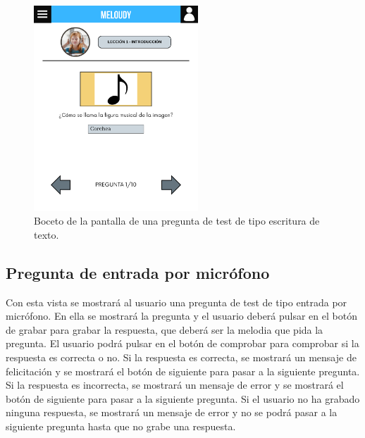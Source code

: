 \begin{figure}[H]
    \centering
    \centerline{\includegraphics[width=0.55\textwidth, frame]{imagenes/c6/7.png}}
    \caption{Boceto de la pantalla de una pregunta de test de tipo escritura de texto.}
    \label{fig:escrituratexto}
\end{figure}

\newpage

\subsection*{Pregunta de entrada por micrófono}

Con esta vista se mostrará al usuario una pregunta de test de tipo entrada por micrófono. En ella se mostrará la pregunta y el usuario deberá pulsar en el botón de grabar para grabar la respuesta, que deberá ser la melodia que pida la pregunta. El usuario podrá pulsar en el botón de comprobar para comprobar si la respuesta es correcta o no. Si la respuesta es correcta, se mostrará un mensaje de felicitación y se mostrará el botón de siguiente para pasar a la siguiente pregunta. Si la respuesta es incorrecta, se mostrará un mensaje de error y se mostrará el botón de siguiente para pasar a la siguiente pregunta. Si el usuario no ha grabado ninguna respuesta, se mostrará un mensaje de error y no se podrá pasar a la siguiente pregunta hasta que no grabe una respuesta.

